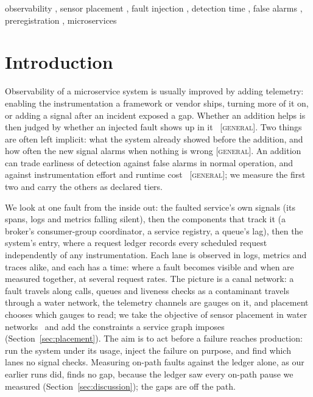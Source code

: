 \documentclass{ceurart}
\newcommand{\scope}[1]{\textsc{[#1]}}
\begin{document}
\begin{keywords}
  observability \sep
  sensor placement \sep
  fault injection \sep
  detection time \sep
  false alarms \sep
  preregistration \sep
  microservices
\end{keywords}

\maketitle

\section{Introduction}\label{sec:intro}
Observability of a microservice system is usually improved by adding telemetry: enabling the instrumentation a
framework or vendor ships, turning more of it on, or adding a signal after an incident exposed a gap. Whether an addition
helps is then judged by whether an injected fault shows up in it~\cite{borges2024informed,borges2024oxn}
\scope{general}. Two things are often left implicit: what the system already showed before the addition, and how often
the new signal alarms when nothing is wrong \scope{general}. An addition can trade earliness of detection against false
alarms in normal operation, and against instrumentation effort and runtime
cost~\cite{dinga_empirical_2023,reichelt_benchmarking_2026,hammad_empirical_2025} \scope{general}; we measure the first two and carry the others
as declared tiers.

We look at one fault from the inside out: the faulted service's own signals (its spans, logs and metrics falling
silent), then the components that track it (a broker's consumer-group coordinator, a service registry, a queue's lag),
then the system's entry, where a request ledger records every scheduled request independently of any instrumentation.
Each lane is observed in logs, metrics and traces alike, and each has a time: where a fault becomes visible and when
are measured together, at several request rates. The picture is a canal network: a fault travels along calls, queues and
liveness checks as a contaminant travels through a water network, the telemetry channels are gauges on it, and placement
chooses which gauges to read; we take the objective of sensor placement in water networks~\cite{leskovec_cost-effective_2007}
and add the constraints a service graph imposes (Section~\ref{sec:placement}). The aim is to act before a failure reaches
production: run the system under its usage, inject the failure on purpose, and find which lanes no signal checks.
Measuring on-path faults against the ledger alone, as our earlier runs did, finds no gap, because the ledger saw every
on-path pause we measured (Section~\ref{sec:discussion}); the gaps are off the path.
\end{document}
